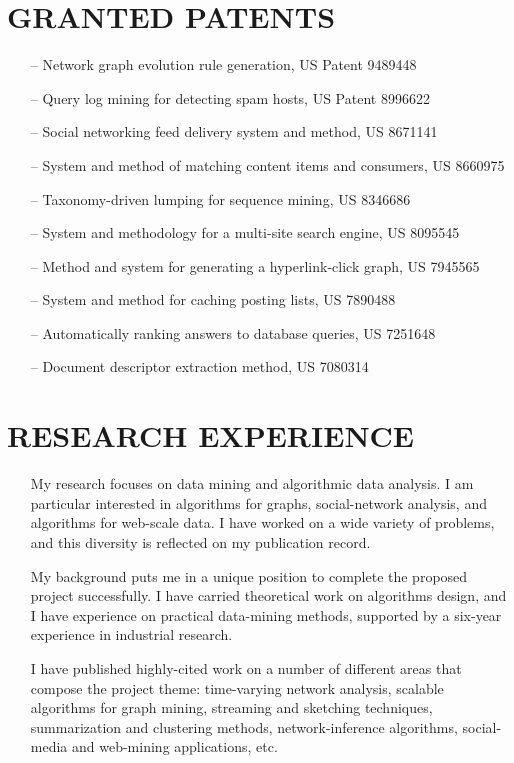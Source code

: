 \documentclass[a4paper,11pt]{res}
\begin{document}
\begin{resume}
\section{{\small GRANTED PATENTS}}
\begin{itemize}
\setlength{\itemsep}{0pt}
\item [--]	
Network graph evolution rule generation, US Patent 9489448	
\item [--]	
Query log mining for detecting spam hosts, US Patent 8996622
\item [--]
Social networking feed delivery system and method, US 8671141
\item [--]
System and method of matching content items and consumers, US 8660975 
\item [--]
Taxonomy-driven lumping for sequence mining, US 8346686
\item [--]
System and methodology for a multi-site search engine, US 8095545
\item [--]
Method and system for generating a hyperlink-click graph, US 7945565
\item [--]
System and method for caching posting lists, US 7890488
\item [--]
Automatically ranking answers to database queries, US 7251648
\item [--]
Document descriptor extraction method, US 7080314
\end{itemize}

\iffalse
\section{{\small RESEARCH EXPERIENCE}}
\begin{itemize}
\setlength{\itemsep}{1pt}
\item[]
My research focuses on data mining and algorithmic data analysis.
I am particular interested in algorithms for graphs, social-network analysis, and algorithms for web-scale data. 
I have worked on a wide variety of problems, 
and this diversity is reflected on my publication record. 

My background puts me in a unique position 
to complete the proposed project successfully. 
I have carried the\-ore\-ti\-cal work on algorithms design,
and I have experience on practical data-mining methods, 
supported by a six-year experience in industrial research. 

I have published highly-cited work 
on a number of different areas that compose the project theme:
time-varying network analysis, 
scalable algorithms for graph mining, 
streaming and sketching techniques, 
summarization and clustering methods, 
network-inference algorithms, 
social-media and web-mining applications, etc.


\end{itemize}
\end{resume}
\end{document}
